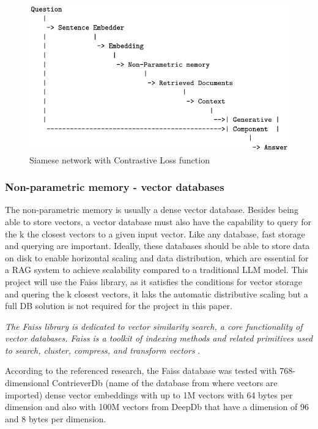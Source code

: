 \documentclass{wseas}
\begin{document}
\begin{figure}[htbp]
  \centering
  \includegraphics[width=\linewidth]{resources/v1/retrievalSystemRetreavalPhase.png} %
  \caption{Siamese network with Contrastive Loss function}
  \label{fig:retrieval_system_retreaval_phase_figure}
\end{figure}

\subsubsection{Non-parametric memory - vector databases}

The non-parametric memory is usually a dense vector database. Besides
being able to store vectors, a vector database must also have the
capability to query for the k the closest vectors to a given input
vector. Like any database, fast storage and querying are important.
Ideally, these databases should be able to store data on disk to enable
horizontal scaling and data distribution, which are essential for a RAG
system to achieve scalability compared to a traditional LLM model. This
project will use the Faiss library, as it satisfies the conditions for
vector storage and quering the k closest vectors, it laks the automatic
distributive scaling but a full DB solution is not required for the
project in this paper.

\emph{The Faiss library is dedicated to vector similarity search, a core
functionality of vector databases. Faiss is a toolkit of indexing
methods and related primitives used to search, cluster, compress, and
transform vectors} \cite{cite2}.

According to the referenced research, the Faiss database was tested with
768-dimensional ContrieverDb (name of the database from where vectors
are imported) dense vector embeddings with up to 1M vectors with 64
bytes per dimension and also with 100M vectors from DeepDb that have a
dimension of 96 and 8 bytes per dimension.
\end{document}

